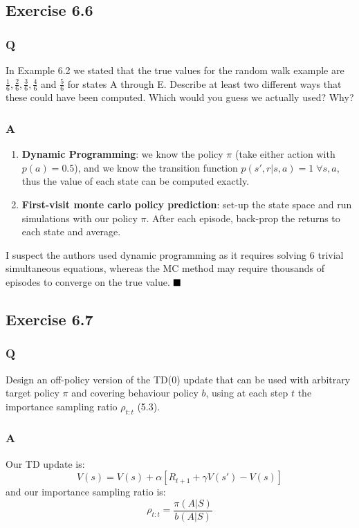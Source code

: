 \subsection{Exercise 6.6}
\subsubsection{Q}
In Example 6.2 we stated that the true values for the random walk example are $\frac{1}{6}, \frac{2}{6}, \frac{3}{6}, \frac{4}{6}$ and $\frac{5}{6}$ for states A through E. Describe at least two different ways that these could have been computed. Which would you guess we actually used? Why?
\subsubsection{A}
\begin{enumerate}
	\item \textbf{Dynamic Programming}: we know the policy $\pi$ (take either action with $p(a) = 0.5$), and we know the transition function $p(s', r | s, a) = 1 \; \forall s,a $, thus the value of each state can be computed exactly.
	\item \textbf{First-visit monte carlo policy prediction}: set-up the state space and run simulations with our policy $\pi$. After each episode, back-prop the returns to each state and average.
\end{enumerate}

I suspect the authors used dynamic programming as it requires solving 6 trivial simultaneous equations, whereas the MC method may require thousands of episodes to converge on the true value.
$
\hfill \blacksquare
$

\subsection{Exercise 6.7}
\subsubsection{Q}
Design an off-policy version of the TD(0) update that can be used with arbitrary target policy $\pi$ and covering behaviour policy $b$, using at each step $t$ the importance sampling ratio $\rho_{t:t}$ (5.3).
\subsubsection{A}
Our TD update is:
\begin{equation}
V(s) = V(s) + \alpha \left[R_{t+1} + \gamma V(s') - V(s)\right]
\end{equation}
and our importance sampling ratio is:
\begin{equation}
\rho_{t:t} = \frac{\pi(A | S)}{b(A | S)}
\end{equation}

